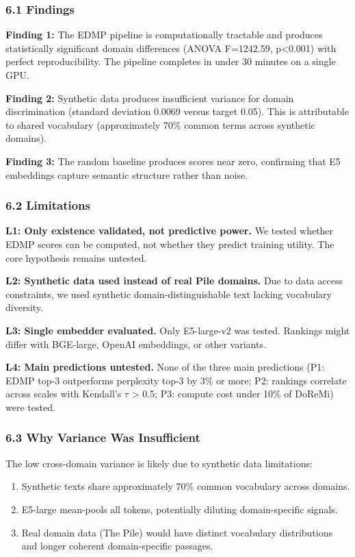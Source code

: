 
\subsubsection{6.1 Findings}

\textbf{Finding 1:} The EDMP pipeline is computationally tractable and produces statistically significant domain differences (ANOVA F=1242.59, p<0.001) with perfect reproducibility. The pipeline completes in under 30 minutes on a single GPU.

\textbf{Finding 2:} Synthetic data produces insufficient variance for domain discrimination (standard deviation 0.0069 versus target 0.05). This is attributable to shared vocabulary (approximately 70\% common terms across synthetic domains).

\textbf{Finding 3:} The random baseline produces scores near zero, confirming that E5 embeddings capture semantic structure rather than noise.

\subsubsection{6.2 Limitations}

\textbf{L1: Only existence validated, not predictive power.} We tested whether EDMP scores can be computed, not whether they predict training utility. The core hypothesis remains untested.

\textbf{L2: Synthetic data used instead of real Pile domains.} Due to data access constraints, we used synthetic domain-distinguishable text lacking vocabulary diversity.

\textbf{L3: Single embedder evaluated.} Only E5-large-v2 was tested. Rankings might differ with BGE-large, OpenAI embeddings, or other variants.

\textbf{L4: Main predictions untested.} None of the three main predictions (P1: EDMP top-3 outperforms perplexity top-3 by 3\% or more; P2: rankings correlate across scales with Kendall's $\tau$ > 0.5; P3: compute cost under 10\% of DoReMi) were tested.

\subsubsection{6.3 Why Variance Was Insufficient}

The low cross-domain variance is likely due to synthetic data limitations:

\begin{enumerate}
\item Synthetic texts share approximately 70\% common vocabulary across domains.
\item E5-large mean-pools all tokens, potentially diluting domain-specific signals.
\item Real domain data (The Pile) would have distinct vocabulary distributions and longer coherent domain-specific passages.
\end{enumerate}

